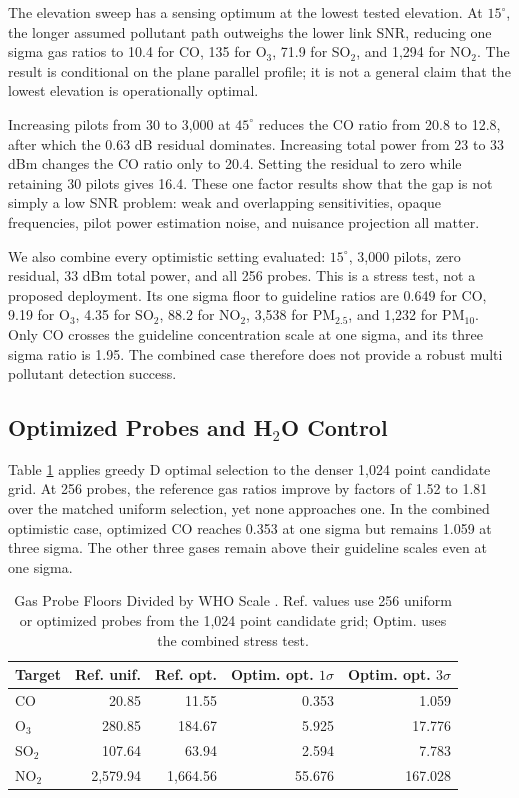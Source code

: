 \documentclass[conference]{IEEEtran}
\newcommand{\pmfive}{PM$_{2.5}$}
\newcommand{\pmten}{PM$_{10}$}
\begin{document}
The elevation sweep has a sensing optimum at the lowest tested elevation. At $15^\circ$, the longer assumed pollutant path outweighs the lower link SNR, reducing one sigma gas ratios to 10.4 for CO, 135 for O$_3$, 71.9 for SO$_2$, and 1,294 for NO$_2$. The result is conditional on the plane parallel profile; it is not a general claim that the lowest elevation is operationally optimal.

Increasing pilots from 30 to 3,000 at $45^\circ$ reduces the CO ratio from 20.8 to 12.8, after which the 0.63 dB residual dominates. Increasing total power from 23 to 33 dBm changes the CO ratio only to 20.4. Setting the residual to zero while retaining 30 pilots gives 16.4. These one factor results show that the gap is not simply a low SNR problem: weak and overlapping sensitivities, opaque frequencies, pilot power estimation noise, and nuisance projection all matter.

We also combine every optimistic setting evaluated: $15^\circ$, 3,000 pilots, zero residual, 33 dBm total power, and all 256 probes. This is a stress test, not a proposed deployment. Its one sigma floor to guideline ratios are 0.649 for CO, 9.19 for O$_3$, 4.35 for SO$_2$, 88.2 for NO$_2$, 3,538 for \pmfive, and 1,232 for \pmten. Only CO crosses the guideline concentration scale at one sigma, and its three sigma ratio is 1.95. The combined case therefore does not provide a robust multi pollutant detection success.

\subsection{Optimized Probes and H$_2$O Control}

Table \ref{tab:optimized} applies greedy D optimal selection to the denser 1,024 point candidate grid. At 256 probes, the reference gas ratios improve by factors of 1.52 to 1.81 over the matched uniform selection, yet none approaches one. In the combined optimistic case, optimized CO reaches 0.353 at one sigma but remains 1.059 at three sigma. The other three gases remain above their guideline scales even at one sigma.

\begin{table}[t]
\caption{Gas Probe Floors Divided by WHO Scale \cite{who2021aqg}. Ref. values use 256 uniform or optimized probes from the 1,024 point candidate grid; Optim. uses the combined stress test.}
\label{tab:optimized}
\centering
\scriptsize
\setlength{\tabcolsep}{2.4pt}
\begin{tabular}{@{}lrrrr@{}}
\toprule
Target & Ref. unif. & Ref. opt. & Optim. opt. $1\sigma$ & Optim. opt. $3\sigma$ \\
\midrule
CO & 20.85 & 11.55 & 0.353 & 1.059 \\
O$_3$ & 280.85 & 184.67 & 5.925 & 17.776 \\
SO$_2$ & 107.64 & 63.94 & 2.594 & 7.783 \\
NO$_2$ & 2,579.94 & 1,664.56 & 55.676 & 167.028 \\
\bottomrule
\end{tabular}
\end{table}
\end{document}
